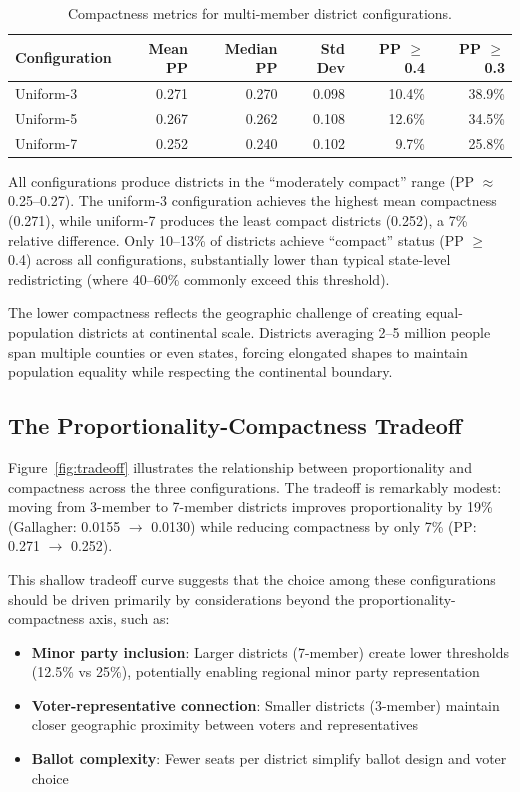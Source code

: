 \begin{table}[h]
\centering
\caption{Compactness metrics for multi-member district configurations.}
\label{tab:compactness}
\begin{tabular}{lrrrrr}
\toprule
Configuration & Mean PP & Median PP & Std Dev & PP $\geq$ 0.4 & PP $\geq$ 0.3 \\
\midrule
Uniform-3 & 0.271 & 0.270 & 0.098 & 10.4\% & 38.9\% \\
Uniform-5 & 0.267 & 0.262 & 0.108 & 12.6\% & 34.5\% \\
Uniform-7 & 0.252 & 0.240 & 0.102 & 9.7\% & 25.8\% \\
\bottomrule
\end{tabular}
\end{table}

All configurations produce districts in the ``moderately compact'' range (PP $\approx$ 0.25--0.27). The uniform-3 configuration achieves the highest mean compactness (0.271), while uniform-7 produces the least compact districts (0.252), a 7\% relative difference. Only 10--13\% of districts achieve ``compact'' status (PP $\geq$ 0.4) across all configurations, substantially lower than typical state-level redistricting (where 40--60\% commonly exceed this threshold).

The lower compactness reflects the geographic challenge of creating equal-population districts at continental scale. Districts averaging 2--5 million people span multiple counties or even states, forcing elongated shapes to maintain population equality while respecting the continental boundary.

\subsection{The Proportionality-Compactness Tradeoff}

Figure~\ref{fig:tradeoff} illustrates the relationship between proportionality and compactness across the three configurations. The tradeoff is remarkably modest: moving from 3-member to 7-member districts improves proportionality by 19\% (Gallagher: 0.0155 $\rightarrow$ 0.0130) while reducing compactness by only 7\% (PP: 0.271 $\rightarrow$ 0.252).

This shallow tradeoff curve suggests that the choice among these configurations should be driven primarily by considerations beyond the proportionality-compactness axis, such as:
\begin{itemize}
    \item \textbf{Minor party inclusion}: Larger districts (7-member) create lower thresholds (12.5\% vs 25\%), potentially enabling regional minor party representation
    \item \textbf{Voter-representative connection}: Smaller districts (3-member) maintain closer geographic proximity between voters and representatives
    \item \textbf{Ballot complexity}: Fewer seats per district simplify ballot design and voter choice
\end{itemize}

